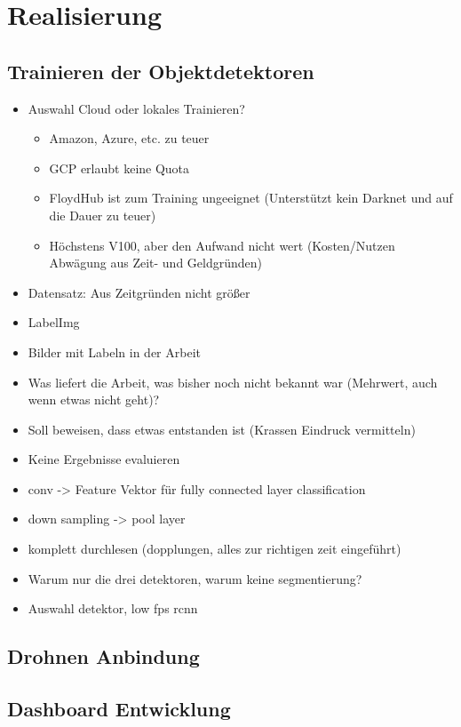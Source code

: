 \chapter{Realisierung}

\section{Trainieren der Objektdetektoren}

\begin{itemize}
	\item Auswahl Cloud oder lokales Trainieren?
	\begin{itemize}
		\item Amazon, Azure, etc. zu teuer
		\item GCP erlaubt keine Quota
		\item FloydHub ist zum Training ungeeignet (Unterstützt kein Darknet und auf die Dauer zu teuer)
		\item Höchstens V100, aber den Aufwand nicht wert (Kosten/Nutzen Abwägung aus Zeit- und Geldgründen)
	\end{itemize}
	\item Datensatz: Aus Zeitgründen nicht größer
	\item LabelImg
	\item Bilder mit Labeln in der Arbeit
	\item Was liefert die Arbeit, was bisher noch nicht bekannt war (Mehrwert, auch wenn etwas nicht geht)?
	\item Soll beweisen, dass etwas entstanden ist (Krassen Eindruck vermitteln)
	\item Keine Ergebnisse evaluieren
	\item conv -> Feature Vektor für fully connected layer classification
	\item down sampling -> pool layer
	\item komplett durchlesen (dopplungen, alles zur richtigen zeit eingeführt)
	\item Warum nur die drei detektoren, warum keine segmentierung?
	\item Auswahl detektor, low fps rcnn
\end{itemize}

\section{Drohnen Anbindung}

\section{Dashboard Entwicklung}
